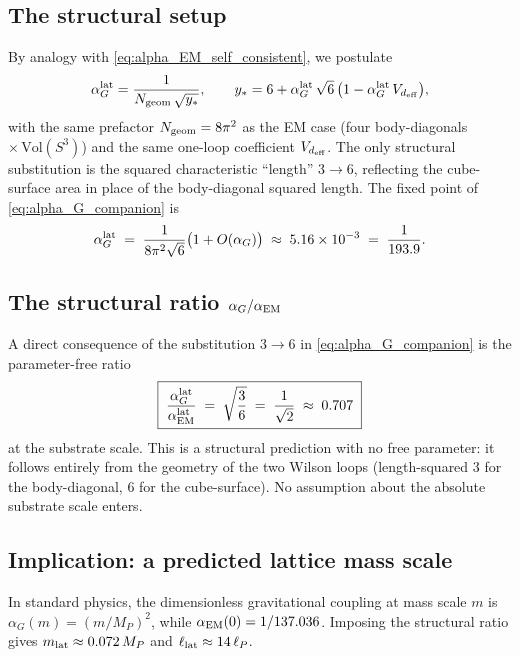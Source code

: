 \documentclass[11pt,a4paper]{article}
\begin{document}
\subsection{The structural setup}

By analogy with \eqref{eq:alpha_EM_self_consistent}, we
postulate
\begin{equation}
\alpha_{G}^{\rm lat}
= \frac{1}{N_{\rm geom}\,\sqrt{y_*}},
\qquad
y_* = 6 + \alpha_{G}^{\rm lat}\,\sqrt{6}\,
\big(1 - \alpha_{G}^{\rm lat}\,V_{d_{\rm eff}}\big),
\label{eq:alpha_G_companion}
\end{equation}
with the same prefactor $N_{\rm geom} = 8\pi^2$ as the EM case
(four body-diagonals $\times\,\mathrm{Vol}(S^3)$) and the same
one-loop coefficient $V_{d_{\rm eff}}$. The only structural
substitution is the squared characteristic ``length'' $3 \to 6$,
reflecting the cube-surface area in place of the body-diagonal
squared length. The fixed point of \eqref{eq:alpha_G_companion}
is
\[
\alpha_{G}^{\rm lat}\;=\;\frac{1}{8\pi^2\sqrt{6}}
\big(1 + O(\alpha_G)\big)
\;\approx\; 5.16 \times 10^{-3}
\;=\; \frac{1}{193.9}.
\]

\subsection{The structural ratio $\alpha_{G}/\alpha_{\rm EM}$}

A direct consequence of the substitution $3 \to 6$ in
\eqref{eq:alpha_G_companion} is the parameter-free ratio
\begin{equation}
\boxed{\;
\frac{\alpha_{G}^{\rm lat}}{\alpha_{\rm EM}^{\rm lat}}
\;=\;\sqrt{\frac{3}{6}}
\;=\;\frac{1}{\sqrt{2}}\;\approx\;0.707
\;}
\label{eq:grav-em-ratio}
\end{equation}
at the substrate scale. This is a structural prediction with no
free parameter: it follows entirely from the geometry of the
two Wilson loops (length-squared $3$ for the body-diagonal,
$6$ for the cube-surface). No assumption about the absolute
substrate scale enters.

\subsection{Implication: a predicted lattice mass scale}

In standard physics, the dimensionless gravitational coupling
at mass scale $m$ is $\alpha_G(m)=(m/M_P)^2$, while
$\alpha_{\rm EM}(0)=1/137.036$. Imposing the structural ratio
gives $m_{\rm lat}\approx 0.072\,M_P$ and
$\ell_{\rm lat}\approx 14\,\ell_P$.



\end{document}
